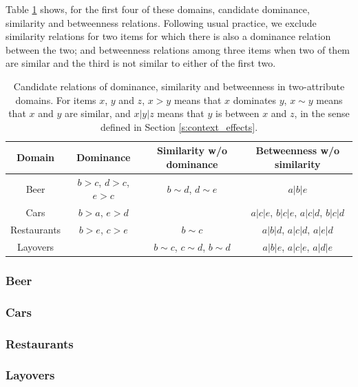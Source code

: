\documentclass[11pt,letter]{article}
\begin{document}
Table \ref{t:CE} shows, for the first four of these domains, candidate dominance, similarity and betweenness relations.
Following usual practice, we exclude similarity relations for two items for which there is also a dominance relation between the two; and betweenness relations among three items when two of them are similar and the third is not similar to either of the first two.

\begin{table}
  \centering
  \begin{tabular}{cccc}
    Domain & Dominance & Similarity w/o dominance & Betweenness w/o similarity \\
    \hline
    Beer
    & $b>c$, $d>c$, $e>c$ & $b \sim d$, $d \sim e$
    & $a|b|e$ \\
    Cars
    & $b>a$, $e>d$ & & $a|c|e$, $b|c|e$, $a|c|d$, $b|c|d$ \\
    Restaurants
    & $b>e$, $c>e$ & $b \sim c$ & $a|b|d$, $a|c|d$, $a|e|d$ \\
    Layovers
    & & $b \sim c$, $c \sim d$, $b \sim d$ & $a|b|e$, $a|c|e$, $a|d|e$ \\
    \hline
  \end{tabular}\caption{Candidate relations of dominance, similarity and betweenness in two-attribute domains. For items $x$, $y$ and $z$, $x>y$ means that $x$ dominates $y$, $x \sim y$ means that $x$ and $y$ are similar, and $x|y|z$ means that $y$ is between $x$ and $z$, in the sense defined in Section \ref{s:context_effects}.}\label{t:CE}
\end{table}

\subsubsection{Beer}



\subsubsection{Cars}



\subsubsection{Restaurants}



\subsubsection{Layovers}
\end{document}
